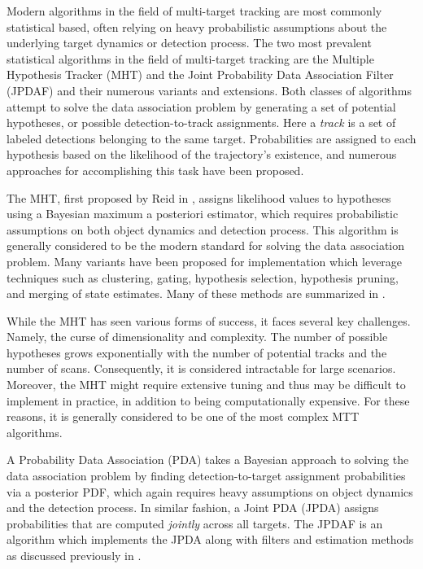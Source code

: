 Modern algorithms in the field of multi-target tracking are most commonly statistical based, often relying on heavy probabilistic assumptions about the underlying target dynamics or detection process. The two most prevalent statistical algorithms in the field of multi-target tracking are the Multiple Hypothesis Tracker (MHT) and the Joint Probability Data Association Filter (JPDAF) and their numerous variants and extensions. Both classes of algorithms attempt to solve the data association problem by generating a set of potential hypotheses, or possible detection-to-track assignments. Here a \textit{track} is a set of labeled detections belonging to the same target. Probabilities are assigned to each hypothesis based on the likelihood of the trajectory's existence, and numerous approaches for accomplishing this task have been proposed.

The MHT, first proposed by Reid in \cite{MHT-Seminal}, assigns likelihood values to hypotheses using a Bayesian maximum a posteriori estimator, which requires probabilistic assumptions on both object dynamics and detection process. This algorithm is generally considered to be the modern standard for solving the data association problem. Many variants have been proposed for implementation which leverage techniques such as clustering, gating, hypothesis selection, hypothesis pruning, and merging of state estimates. Many of these methods are summarized in \cite{MHT-Overview}. 

While the MHT has seen various forms of success, it faces several key challenges. Namely, the curse of dimensionality and complexity. The number of possible hypotheses grows exponentially with the number of potential tracks and the number of scans. Consequently, it is considered intractable for large scenarios. Moreover, the MHT might require extensive tuning and thus may be difficult to implement in practice, in addition to being computationally expensive. For these reasons, it is generally considered to be one of the most complex MTT algorithms. 

A Probability Data Association (PDA) takes a Bayesian approach to solving the data association problem by finding detection-to-target assignment probabilities via a posterior PDF, which again requires heavy assumptions on object dynamics and the detection process. In similar fashion, a Joint PDA (JPDA) assigns probabilities that are computed \textit{jointly} across all targets. The JPDAF is an algorithm which implements the JPDA along with filters and estimation methods as discussed previously in \cite{Bar-Shalom_MTT}.

